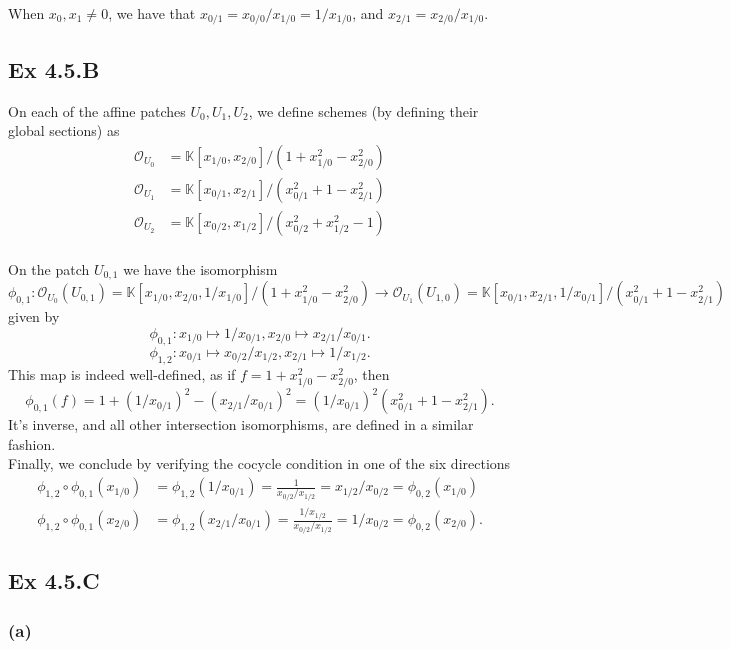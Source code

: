 \documentclass{article}
\theoremstyle{definition}
\newcommand{\K}{\mathbb{K}}
\newcommand{\oo}{\mathcal{O}}
\begin{document}
When $x_0, x_1 \not = 0$, we have that $x_{0/1} = x_{0/0}/x_{1/0} = 1/x_{1/0}$,
and $x_{2/1} = x_{2/0}/x_{1/0}$.

\subsection*{Ex 4.5.B}

On each of the affine patches $U_0, U_1, U_2$, we define schemes (by defining
their global sections) as
\begin{align*}
	\oo_{U_0} & = \K[x_{1/0},x_{2/0}]/(1 + x_{1/0}^2 - x_{2/0}^2) \\
	\oo_{U_1} & = \K[x_{0/1},x_{2/1}]/(x_{0/1}^2 + 1 - x_{2/1}^2) \\
	\oo_{U_2} & = \K[x_{0/2},x_{1/2}]/(x_{0/2}^2 + x_{1/2}^2 - 1) \\
\end{align*}

On the patch $U_{0,1}$ we have the isomorphism
\[
	\phi_{0,1}
	:
	\oo_{U_0}(U_{0,1}) = \K[x_{1/0},x_{2/0},1/x_{1/0}] / (1 + x_{1/0}^2 - x_{2/0}^2)
	\to
	\oo_{U_1}(U_{1,0}) = \K[x_{0/1},x_{2/1},1/x_{0/1}] / (x_{0/1}^2 + 1 - x_{2/1}^2)
\]
given by
\[
	\phi_{0,1}
	:
	x_{1/0} \mapsto 1/x_{0/1},
	x_{2/0} \mapsto x_{2/1}/x_{0/1}.
\]
\[
	\phi_{1,2}
	:
	x_{0/1} \mapsto x_{0/2}/x_{1/2},
	x_{2/1} \mapsto 1/x_{1/2}.
\]
This map is indeed well-defined, as if $f = 1 + x_{1/0}^2 - x_{2/0}^2$,
then
\[
	\phi_{0,1}(f)
	=
	1 + (1/x_{0/1})^{2} - (x_{2/1}/x_{0/1})^{2}
	=
	(1/x_{0/1})^{2}
	(x_{0/1}^{2} + 1 - x_{2/1}^{2}).
\]
It's inverse, and all other intersection isomorphisms, are defined in a similar
fashion. \\

Finally, we conclude by verifying the cocycle condition in one of the six
directions
\begin{align*}
	\phi_{1,2} \circ \phi_{0,1}(x_{1/0})
	 & =
	\phi_{1,2}(1/x_{0/1})
	=
	\frac{1}{x_{0/2}/x_{1/2}}
	=
	x_{1/2}/x_{0/2}
	=
	\phi_{0, 2}(x_{1/0}) \\
	\phi_{1,2} \circ \phi_{0,1}(x_{2/0})
	 & =
	\phi_{1,2}(x_{2/1}/x_{0/1})
	=
	\frac{1/x_{1/2}}{x_{0/2}/x_{1/2}}
	=
	1/x_{0/2}
	=
	\phi_{0,2}(x_{2/0}).
\end{align*}

\subsection*{Ex 4.5.C}
\subsubsection*{(a)}
\end{document}
